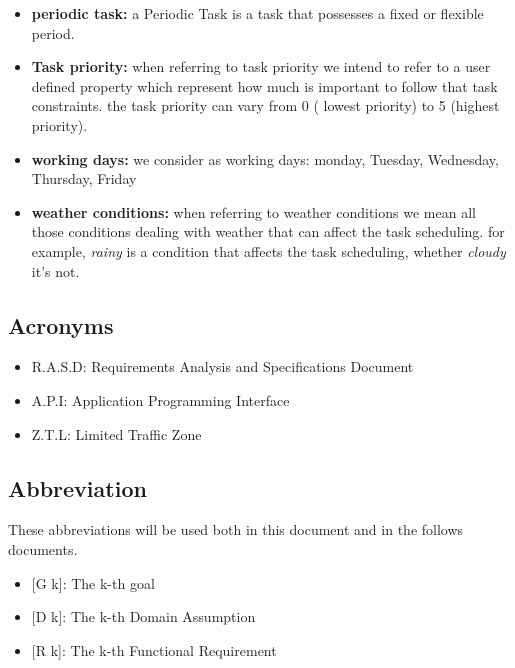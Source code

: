 \begin{itemize}
     \item \textbf{periodic task:} a Periodic Task is a task that possesses a fixed or flexible period.
     
     \item \textbf{Task priority:} when referring to task priority we intend to refer to a user defined property which represent how much is important to follow that task constraints. the task priority can vary from 0 ( lowest priority) to 5 (highest priority).
     
     \item \textbf{working days:} we consider as working days: monday, Tuesday, Wednesday, Thursday, Friday
 
     \item \textbf{weather conditions:} when referring to weather conditions we mean all those conditions dealing with weather that can affect the task scheduling. for example, \emph{rainy} is a condition that affects the task scheduling, whether \emph{cloudy} it's not. 
     
\end{itemize}

\subsection{Acronyms}

\begin{itemize}
  \item R.A.S.D: Requirements Analysis and Specifications Document
  \item A.P.I: Application Programming Interface 
  
  \item Z.T.L: Limited Traffic Zone
\end{itemize}

\subsection{Abbreviation}
These abbreviations will be used both in this document and in the follows documents.

\begin{itemize}
	\item {[}G k{]}: The k-th goal
    \item {[}D k{]}: The k-th Domain Assumption
    \item {[}R k{]}: The k-th Functional Requirement
\end{itemize}
